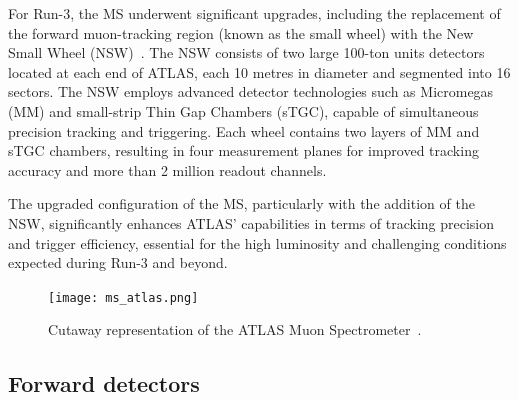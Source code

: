 For Run-3, the MS underwent significant upgrades, including the replacement of the forward muon-tracking region (known as the small wheel) with the New Small Wheel (NSW)~\cite{nsw_tech}. The NSW consists of two large 100-ton units detectors located at each end of ATLAS, each 10 metres in diameter and segmented into 16 sectors. The NSW employs advanced detector technologies such as Micromegas (MM) and small-strip Thin Gap Chambers (sTGC), capable of simultaneous precision tracking and triggering. Each wheel contains two layers of MM and sTGC chambers, resulting in four measurement planes for improved tracking accuracy and more than 2 million readout channels.

The upgraded configuration of the MS, particularly with the addition of the NSW, significantly enhances ATLAS' capabilities in terms of tracking precision and trigger efficiency, essential for the high luminosity and challenging conditions expected during Run-3 and beyond.


\begin{figure}[htbp]
    \centering
        \texttt{[image: ms\_atlas.png]}
    \caption{Cutaway representation of the ATLAS Muon Spectrometer~\cite{ATLAS_run3}.}
    \label{fig:ms_atlas}
\end{figure}

\subsection{Forward detectors}
\label{sec:fwd}

